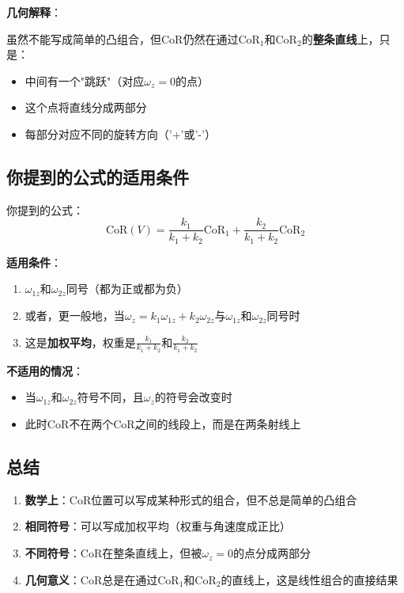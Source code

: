 \documentclass[12pt,a4paper]{article}
\begin{document}
\textbf{几何解释}：

虽然不能写成简单的凸组合，但CoR仍然在通过CoR$_1$和CoR$_2$的\textbf{整条直线}上，只是：
\begin{itemize}
\item 中间有一个"跳跃"（对应$\omega_z = 0$的点）
\item 这个点将直线分成两部分
\item 每部分对应不同的旋转方向（'+'或'-'）
\end{itemize}

\subsection{你提到的公式的适用条件}

你提到的公式：
\begin{equation}
\text{CoR}(V) = \frac{k_1}{k_1 + k_2} \text{CoR}_1 + \frac{k_2}{k_1 + k_2} \text{CoR}_2
\end{equation}

\textbf{适用条件}：
\begin{enumerate}
\item $\omega_{1z}$和$\omega_{2z}$同号（都为正或都为负）
\item 或者，更一般地，当$\omega_z = k_1 \omega_{1z} + k_2 \omega_{2z}$与$\omega_{1z}$和$\omega_{2z}$同号时
\item 这是\textbf{加权平均}，权重是$\frac{k_1}{k_1 + k_2}$和$\frac{k_2}{k_1 + k_2}$
\end{enumerate}

\textbf{不适用的情况}：
\begin{itemize}
\item 当$\omega_{1z}$和$\omega_{2z}$符号不同，且$\omega_z$的符号会改变时
\item 此时CoR不在两个CoR之间的线段上，而是在两条射线上
\end{itemize}

\subsection{总结}

\begin{enumerate}
\item \textbf{数学上}：CoR位置可以写成某种形式的组合，但不总是简单的凸组合

\item \textbf{相同符号}：可以写成加权平均（权重与角速度成正比）

\item \textbf{不同符号}：CoR在整条直线上，但被$\omega_z = 0$的点分成两部分

\item \textbf{几何意义}：CoR总是在通过CoR$_1$和CoR$_2$的直线上，这是线性组合的直接结果
\end{enumerate}
\end{document}
